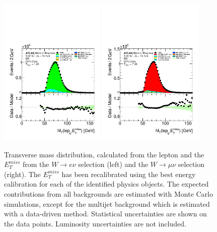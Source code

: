 \begin{figure}[htbp]
\centering
\includegraphics[width=0.45\textwidth]{figures/SR/dataMc-lepmet_mt-SR-bkgQCD-el.pdf}
\includegraphics[width=0.45\textwidth]{figures/SR/dataMc-lepmet_mt-SR-bkgQCD-mu.pdf}
\caption{
Transverse mass distribution, calculated from the lepton and the $E_{T}^{miss}$ from the $W \rightarrow e\nu$ selection (left) and the $W \rightarrow \mu\nu$ selection (right).
The $E_{T}^{miss}$ has been recalibrated using the best energy calibration for each of the identified physics objects.
The expected contributions from all backgrounds are estimated with Monte Carlo simulations, except for the multijet background which is estimated with a data-driven method. 
Statistical uncertainties are shown on the data points.
Luminosity uncertainties are not included.
}
\label{fig:SR_met_reco_et}
\end{figure}

